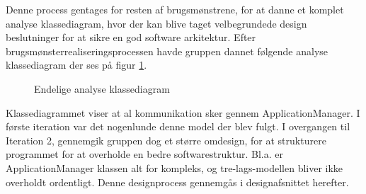 Denne process gentages for resten af brugsmønstrene, for at danne et komplet analyse klassediagram, hvor der kan blive taget velbegrundede design beslutninger for at sikre en god software arkitektur. Efter brugsmønsterrealiseringsprocessen havde gruppen dannet følgende analyse klassediagram der ses på figur \ref{fig:AnalyseKlasseDiagramV3}.

\begin{figure}[H]
{}
    \caption{Endelige analyse klassediagram}
    \label{fig:AnalyseKlasseDiagramV3}
\end{figure}

Klassediagrammet viser at al kommunikation sker gennem ApplicationManager. I første iteration var det nogenlunde denne model der blev fulgt. I overgangen til Iteration 2, gennemgik gruppen dog et større omdesign, for at strukturere programmet for at overholde en bedre softwarestruktur. Bl.a. er ApplicationManager klassen alt for kompleks, og tre-lags-modellen bliver ikke overholdt ordentligt. Denne designprocess gennemgås i designafsnittet herefter. 




